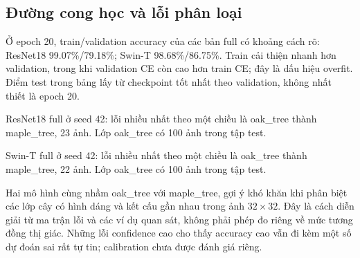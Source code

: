 \subsection{Đường cong học và lỗi phân loại}
Ở epoch 20, train/validation accuracy của các bản full có khoảng cách rõ: ResNet18 99.07\%/79.18\%; Swin-T 98.68\%/86.75\%. Train cải thiện nhanh hơn validation, trong khi validation CE còn cao hơn train CE; đây là dấu hiệu overfit. Điểm test trong bảng lấy từ checkpoint tốt nhất theo validation, không nhất thiết là epoch 20.

ResNet18 full ở seed 42: lỗi nhiều nhất theo một chiều là oak\_tree thành maple\_tree, 23 ảnh. Lớp oak\_tree có 100 ảnh trong tập test.

Swin-T full ở seed 42: lỗi nhiều nhất theo một chiều là oak\_tree thành maple\_tree, 22 ảnh. Lớp oak\_tree có 100 ảnh trong tập test.

Hai mô hình cùng nhầm oak\_tree với maple\_tree, gợi ý khó khăn khi phân biệt các lớp cây có hình dáng và kết cấu gần nhau trong ảnh $32\times32$. Đây là cách diễn giải từ ma trận lỗi và các ví dụ quan sát, không phải phép đo riêng về mức tương đồng thị giác. Những lỗi confidence cao cho thấy accuracy cao vẫn đi kèm một số dự đoán sai rất tự tin; calibration chưa được đánh giá riêng.
